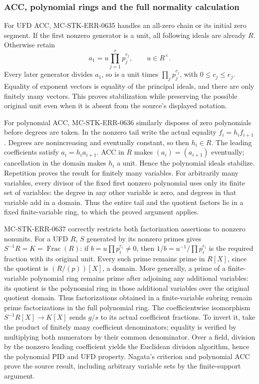 \subsubsection{ACC, polynomial rings and the full normality calculation}\label{algebra-proof-029-acc-polynomial-rings-and-the-full-normality-calculation}

For UFD ACC, MC-\AlgebraIdentifierBreak{}STK-\AlgebraIdentifierBreak{}ERR-\AlgebraIdentifierBreak{}0635 handles an all-zero chain or its initial zero segment. If the first nonzero generator is a unit, all following ideals are already \(R\). Otherwise retain \[
 a_1=u\prod_{j=1}^r p_j^{e_j},\qquad u\in R^\times.
\] Every later generator divides \(a_1\), so is a unit times \(\prod_jp_j^{c_j}\), with \(0\le c_j\le e_j\). Equality of exponent vectors is equality of the principal ideals, and there are only finitely many vectors. This proves stabilization while preserving the possible original unit even when it is absent from the source's displayed notation.

For polynomial ACC, MC-\AlgebraIdentifierBreak{}STK-\AlgebraIdentifierBreak{}ERR-\AlgebraIdentifierBreak{}0636 similarly disposes of zero polynomials before degrees are taken. In the nonzero tail write the actual equality \(f_i=h_i f_{i+1}\). Degrees are nonincreasing and eventually constant, so then \(h_i\in R\). The leading coefficients satisfy \(a_i=h_i a_{i+1}\). ACC in \(R\) makes \((a_i)=(a_{i+1})\) eventually; cancellation in the domain makes \(h_i\) a unit. Hence the polynomial ideals stabilize. Repetition proves the result for finitely many variables. For arbitrarily many variables, every divisor of the fixed first nonzero polynomial uses only its finite set of variables: the degree in any other variable is zero, and degrees in that variable add in a domain. Thus the entire tail and the quotient factors lie in a fixed finite-variable ring, to which the proved argument applies.

MC-\AlgebraIdentifierBreak{}STK-\AlgebraIdentifierBreak{}ERR-\AlgebraIdentifierBreak{}0637 correctly restricts both factorization assertions to nonzero nonunits. For a UFD \(R\), \(S\) generated by its nonzero primes gives \(S^{-1}R=K=\operatorname{Frac}(R)\): if \(b=u\prod p_i^{e_i}\ne0\), then \(1/b=u^{-1}/\prod p_i^{e_i}\) is the required fraction with its original unit. Every such prime remains prime in \(R[X]\), since the quotient is \((R/(p))[X]\), a domain. More generally, a prime of a finite-variable polynomial ring remains prime after adjoining any additional variables: its quotient is the polynomial ring in those additional variables over the original quotient domain. Thus factorizations obtained in a finite-variable subring remain prime factorizations in the full polynomial ring. The coefficientwise isomorphism \(S^{-1}R[X]\to K[X]\) sends \(g/s\) to its actual coefficient fractions. To invert it, take the product of finitely many coefficient denominators; equality is verified by multiplying both numerators by their common denominator. Over a field, division by the nonzero leading coefficient yields the Euclidean division algorithm, hence the polynomial PID and UFD property. Nagata's criterion and polynomial ACC prove the source result, including arbitrary variable sets by the finite-support argument.

